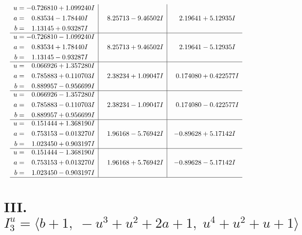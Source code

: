 \documentclass[1p]{elsarticle_modified}
\theoremstyle{definition}
\begin{document}
$$\begin{array}{c|c|c}
\begin{aligned}
u &= -0.726810 + 1.099240 I \\
a &= \phantom{-}0.83534 - 1.78440 I \\
b &= \phantom{-}1.13145 + 0.93287 I\end{aligned}
 & \phantom{-}8.25713 - 9.46502 I & \phantom{-}2.19641 + 5.12935 I \\ \hline\begin{aligned}
u &= -0.726810 - 1.099240 I \\
a &= \phantom{-}0.83534 + 1.78440 I \\
b &= \phantom{-}1.13145 - 0.93287 I\end{aligned}
 & \phantom{-}8.25713 + 9.46502 I & \phantom{-}2.19641 - 5.12935 I \\ \hline\begin{aligned}
u &= \phantom{-}0.066926 + 1.357280 I \\
a &= \phantom{-}0.785883 + 0.110703 I \\
b &= \phantom{-}0.889957 - 0.956699 I\end{aligned}
 & \phantom{-}2.38234 + 1.09047 I & \phantom{-}0.174080 + 0.422577 I \\ \hline\begin{aligned}
u &= \phantom{-}0.066926 - 1.357280 I \\
a &= \phantom{-}0.785883 - 0.110703 I \\
b &= \phantom{-}0.889957 + 0.956699 I\end{aligned}
 & \phantom{-}2.38234 - 1.09047 I & \phantom{-}0.174080 - 0.422577 I \\ \hline\begin{aligned}
u &= \phantom{-}0.151444 + 1.368190 I \\
a &= \phantom{-}0.753153 - 0.013270 I \\
b &= \phantom{-}1.023450 + 0.903197 I\end{aligned}
 & \phantom{-}1.96168 - 5.76942 I & -0.89628 + 5.17142 I \\ \hline\begin{aligned}
u &= \phantom{-}0.151444 - 1.368190 I \\
a &= \phantom{-}0.753153 + 0.013270 I \\
b &= \phantom{-}1.023450 - 0.903197 I\end{aligned}
 & \phantom{-}1.96168 + 5.76942 I & -0.89628 - 5.17142 I\\
 \hline 
 \end{array}$$\newpage\newpage\renewcommand{\arraystretch}{1}
\centering \section*{III. $I^u_{3}= \langle b+1,\;- u^3+u^2+2 a+1,\;u^4+u^2+u+1 \rangle$}
\end{document}
